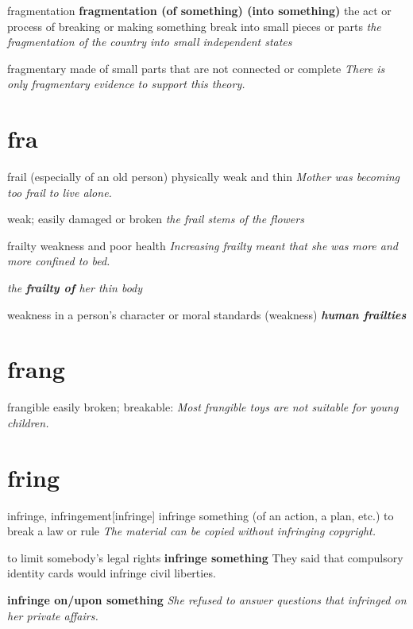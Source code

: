 \begin{DefWord}{fragmentation}
    \textbf{fragmentation (of something) (into something)} the act or process of breaking or making something break into small pieces or parts
    \textit{the fragmentation of the country into small independent states}
\end{DefWord}


\begin{DefWord}{fragmentary}
    made of small parts that are not connected or complete
    \textit{There is only fragmentary evidence to support this theory.}

\end{DefWord}




\section{fra}

\begin{DefWord}{frail}
    (especially of an old person) physically weak and thin
    \textit{Mother was becoming too frail to live alone.}

    weak; easily damaged or broken
    \textit{the frail stems of the flowers}
\end{DefWord}

\begin{DefWord}{frailty}
    weakness and poor health
    \textit{Increasing frailty meant that she was more and more confined to bed.}

    \textit{the \textbf{frailty of} her thin body}

    weakness in a person’s character or moral standards (weakness)
    \textit{\textbf{human frailties}}
\end{DefWord}

\section{frang}

\begin{DefWord}{frangible}
    easily broken; breakable:
\textit{Most frangible toys are not suitable for young children.}
\end{DefWord}

\section{fring}

\begin{DefWord}{infringe, infringement}[infringe]
    infringe something (of an action, a plan, etc.) to break a law or rule
    \textit{The material can be copied without infringing copyright.}

    to limit somebody’s legal rights
    \textbf{infringe something} They said that compulsory identity cards would infringe civil liberties.

    \textbf{infringe on/upon something} \textit{She refused to answer questions that infringed on her private affairs.}
\end{DefWord}



